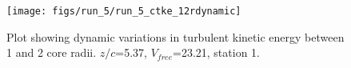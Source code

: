 \begin{figure}[H]
\centering
\texttt{[image: figs/run\_5/run\_5\_ctke\_12rdynamic]}
\caption{Plot showing dynamic variations in turbulent kinetic energy between 1 and 2 core radii. $z/c$=5.37, $V_{free}$=23.21, station 1.}
\label{fig:run_5_ctke_12rdynamic}
\end{figure}


